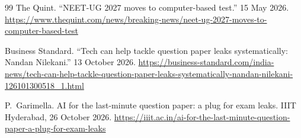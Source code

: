 \documentclass[10pt,a4paper]{article}
\theoremstyle{remark}
\begin{document}
\begin{thebibliography}{99}
 The Quint. \enquote{NEET-UG 2027 moves to computer-based test.} 15 May 2026. \url{https://www.thequint.com/news/breaking-news/neet-ug-2027-moves-to-computer-based-test}

 Business Standard. \enquote{Tech can help tackle question paper leaks systematically: Nandan Nilekani.} 13 October 2026. \url{https://business-standard.com/india-news/tech-can-help-tackle-question-paper-leaks-systematically-nandan-nilekani-126101300518_1.html}

 P.~Garimella. AI for the last-minute question paper: a plug for exam leaks. IIIT Hyderabad, 26 October 2026. \url{https://iiit.ac.in/ai-for-the-last-minute-question-paper-a-plug-for-exam-leaks}

\end{thebibliography}
\end{document}
